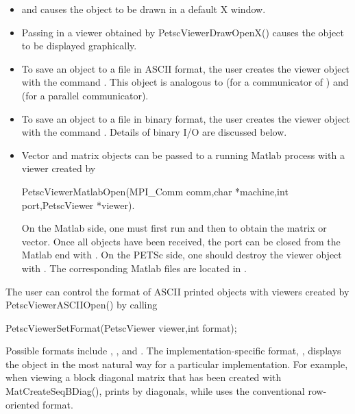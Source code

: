 {{{\begin{itemize}
\item {}  and 
        causes the 
      object to be drawn in a default X window.
\item Passing in a viewer obtained by
      PetscViewerDrawOpenX() causes the object to be displayed graphically.
\item To save an object to a file in ASCII format, the user creates
      the viewer object with the command
      .  
      This object is 
      analogous to  (for a communicator of
      ) and 
       (for a parallel communicator).
\item To save an object to a file in binary format, the user creates
      the viewer object with the command
        .   Details of binary
      I/O are discussed below.
\item Vector and matrix objects can be passed to a running Matlab process
      with a viewer created by 
\begin{tabbing}
     PetscViewerMatlabOpen(MPI\_Comm comm,char *machine,int port,PetscViewer *viewer). 
\end{tabbing} 
      On the Matlab side, one must first run 
      and then  to obtain the matrix or vector. Once all
      objects have been received, the port can be closed from the Matlab end
      with . On the PETSc side, one should destroy
      the viewer object with  . The corresponding Matlab 
      files are located in .
\end{itemize}

The user can control the format of ASCII printed objects with viewers 
created by PetscViewerASCIIOpen() by calling
\begin{tabbing}
  PetscViewerSetFormat(PetscViewer viewer,int format);
\end{tabbing}  
  
 
Possible formats include 
, , and
.  The implementation-specific format, 
, displays the object in the most natural way
for a particular implementation.  For example, when viewing a block 
diagonal matrix that has been created with MatCreateSeqBDiag(),
 prints by diagonals, while 
uses the conventional row-oriented format.

}}}
